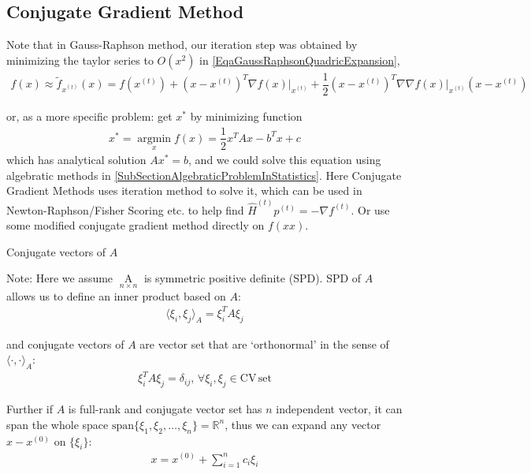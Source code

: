        
\subsection{Conjugate Gradient Method}
\hypertarget{ConjugateGradientMethod}{}
    Note that in Gauss-Raphson method, our iteration step was obtained by minimizing the taylor series to $ O(x^2)  $ in \autoref{EqaGaussRaphsonQuadricExpansion}, 
    \begin{align}
        f(x)\approx \tilde{f}_{x^{(t)}}(x)=f(x^{(t)})+(x-x^{(t)})^T\nabla \left. f(x)\right|_{x^{(t)}}+\dfrac{1}{2}(x-x^{(t)})^T\nabla\nabla \left. f(x) \right|_{x^{(t)}} (x-x^{(t)})
    \end{align}
    
    or, as a more specific problem: get $ x^* $ by minimizing function
    \begin{align}
        x^*=\mathop{\arg\min}\limits_{x} f(x)=\dfrac{1}{2}x^TAx-b^Tx+c 
    \end{align}
    which has analytical solution $ Ax^*=b $, and we could solve this equation using algebratic methods in \autoref{SubSectionAlgebraticProblemInStatistics}. Here Conjugate Gradient Methods uses iteration method to solve it, which can be used in Newton-Raphson/Fisher Scoring etc. to help find $ \hat{H}^{(t)}p^{(t)}=-\nabla f^{(t)} $. Or use some modified conjugate gradient method directly on $ f(xx) $.

\begin{point}
    Conjugate vectors of $ A $
\end{point} 

    Note: Here we assume $ \mathop{A}\limits_{n\times n}  $ is symmetric positive definite (SPD). SPD of $ A $ allows us to define an inner product based on $ A $:
    \begin{align}
        \langle \xi _i,\xi _j\rangle_A=\xi _i^TA\xi _j 
    \end{align}
    
    and conjugate vectors of $ A $ are vector set that are `orthonormal' in the sense of $ \langle\cdot,\cdot\rangle_A $:
    \begin{align}
        \xi ^T_iA\xi _j=\delta_{ij},\,\forall \xi _i,\xi _j\in \mathrm{CV\,set}  
    \end{align}
    
    Further if $ A $ is full-rank and conjugate vector set has $ n $ independent vector, it can span the whole space $ \mathrm{span}\{\xi _1,\xi _2,\ldots,\xi _n\}=\mathbb{R}^n   $, thus we can expand any vector $ x-x^{(0)} $ on $ \{\xi _i\} $:
    \begin{align}
        x=x^{(0)}+ \sum_{i=1}^nc_i\xi _i
    \end{align}
    
